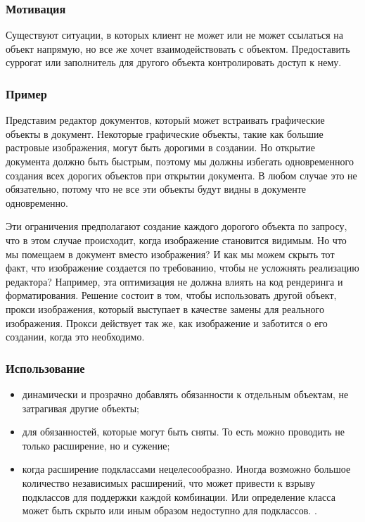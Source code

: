 \documentclass[10pt]{article}
\begin{document}
\subsubsection{Мотивация}
Существуют ситуации, в которых клиент не может или не может ссылаться на объект напрямую, но все же хочет взаимодействовать с объектом.
Предоставить суррогат или заполнитель для другого объекта контролировать доступ к нему.
\subsubsection{Пример}
Представим редактор документов, который может встраивать графические объекты в документ.
Некоторые графические объекты, такие как большие растровые изображения, могут быть дорогими в создании.
Но открытие документа должно быть быстрым, поэтому мы должны избегать одновременного создания всех дорогих
объектов при открытии документа. В любом случае это не обязательно, потому что не все эти объекты будут видны
в документе одновременно.

Эти ограничения предполагают создание каждого дорогого объекта по запросу, что в этом случае происходит,
когда изображение становится видимым. Но что мы помещаем в документ вместо изображения? И как мы можем
скрыть тот факт, что изображение создается по требованию, чтобы не усложнять реализацию редактора?
Например, эта оптимизация не должна влиять на код рендеринга и форматирования.
Решение состоит в том, чтобы использовать другой объект, прокси изображения, который выступает в качестве
замены для реального изображения. Прокси действует так же, как изображение и заботится о его создании, когда это необходимо.
\subsubsection{Использование}
\begin{itemize}
	\item динамически и прозрачно добавлять обязанности к отдельным объектам, не затрагивая другие объекты;
	\item для обязанностей, которые могут быть сняты. То есть можно проводить не только расширение, но и сужение;
	\item когда расширение подклассами нецелесообразно.
	Иногда возможно большое количество независимых расширений, что может привести к взрыву подклассов для поддержки каждой комбинации.
	Или определение класса может быть скрыто или иным образом недоступно для подклассов.
		. 
\end{itemize}
\end{document}
